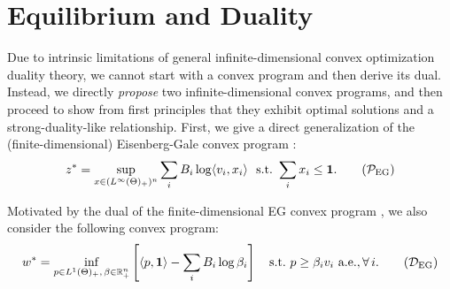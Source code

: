 
\section{Equilibrium and Duality} \label{sec:equi-and-dual}


Due to intrinsic limitations of general infinite-dimensional convex optimization duality theory, we cannot start with a convex program and then derive its dual.
Instead, we directly \emph{propose} two infinite-dimensional convex programs, and then proceed to show from first principles that they exhibit optimal solutions and a strong-duality-like relationship.
First, we give a direct generalization of the (finite-dimensional) Eisenberg-Gale convex program \citep{eisenberg1961aggregation,nisan2007algorithmic}:
\begin{align}
z^* = \sup_{x\in (L^\infty(\Theta)_+)^n} \sum_i B_i \log \langle v_i, x_i \rangle\ \ {\rm s.t.}\ \sum_i x_i \leq \ones. \tag{$\mathcal P_{\rm EG}$} \label{eq:eg-primal}
\end{align}

Motivated by the dual of the finite-dimensional EG convex program \cite[Lemma 3]{cole2017convex}, we also consider the following convex program:
\begin{align}
\begin{split}
w^* = \inf_{p\in L^1(\Theta)_+,\, \beta\in \RR^n_+} \left[ \langle p, \ones \rangle - \sum_i B_i \log \beta_i\right]  \quad {\rm s.t.} \ p \geq \beta_i v_i\ \almeve, \forall\,i. 
\end{split} \tag{$\mathcal D_{\rm EG}$}
\label{eq:eg-dual-beta-p}
\end{align}

